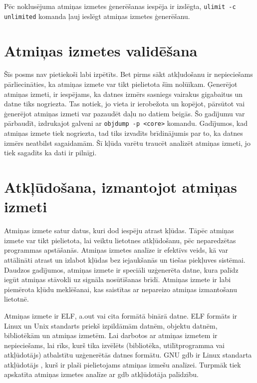  Pēc noklusējuma atmiņas izmetes ģenerēšanas iespēja ir izslēgta,  \texttt{ulimit -c unlimited} komanda ļauj ieslēgt atmiņas izmetes ģenerēšanu.

 \section{ Atmiņas izmetes validēšana }
  \label{sec:validaty}
  
 Šīs posms nav pietiekoši labi izpētīts. Bet pirms sākt atkļudošanu ir nepieciešams pārliecināties, ka atmiņas izmete var tikt pielietota šīm nolūīkam.
 Ģenerējot atmiņas izmeti, ir iespējams, ka datnes izmērs sasniegs vairakus gigabaitus un datne tiks nogriezta.
 Tas notiek, jo vieta ir ierobežota un kopējot, pārsūtot vai ģenerējot atmiņas izmeti var pazaudēt daļu no datiem beigās.
 Šo gadījumu var pārbaudīt, izdrukajot galveni ar \texttt{objdump -p <core>} komandu.
 Gadījumos, kad atmiņas izmete tiek nogriezta, tad tiks izvadīts brīdinājumis par to, ka datnes izmērs neatbilst sagaidamām.
 Šī kļūda varētu traucēt analizēt atmiņas izmeti, jo tiek sagadīts ka dati ir pilnīgi.
 
 
 
 
 
\section{Atkļūdošana, izmantojot atmiņas izmeti}
Atmiņas izmete satur datus, kuri dod iespēju atrast kļūdas. Tāpēc atmiņas izmete var tikt pielietota, lai veiktu lietotnes atkļūdošanu, pēc neparedzētas programmas apstāšanās.
Atmiņas izmetes analīze ir efektīvs veids, kā var attālināti atrast un izlabot kļūdas bez iejaukšanās un tiešas piekļuves sistēmai.
Daudzos gadījumos, atmiņas izmete ir speciāli uzģenerēta datne, kura palīdz iegūt atmiņas stāvokli uz signāla nosūtīšanas brīdī.
Atmiņas izmete ir labi piemērota kļūdu meklēšanai, kas saistītas ar nepareizo atmiņas izmantošanu lietotnē.

Atmiņas izmete ir ELF, a.out vai cita formātā binārā  datne. 
ELF formāts ir Linux un Unix standarts priekš izpildāmām datnēm, objektu datnēm, bibliotēkām un atmiņas izmetēm.
Lai darbotos ar atmiņas izmetem ir nepieciešams, lai rīks, kurš tika izvēlēts (bibliotēka, utilītprogramma vai atkļūdotājs) atbalstītu uzģenerētās datnes formātu.
GNU gdb ir  Linux standarta atkļūdotājs \cite{MWMK}, kurš ir plaši pielietojams atmiņas izmešu analīzei. 
Turpmāk tiek apskatīta atmiņas izmetes analīze ar gdb atkļūdotāja palīdzību.

